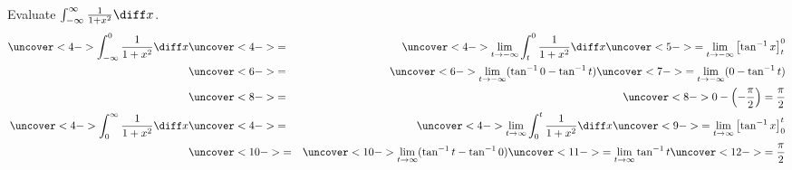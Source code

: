 \begin{frame}
\begin{example} %
Evaluate $\int_{-\infty}^\infty \frac{1}{1+x^2}\diff x$.
\abovedisplayskip=0pt
\belowdisplayskip=0pt
%
\begin{eqnarray*}
\uncover<4->{%
\int_{-\infty}^0 \frac{1}{1+x^2}\diff x%
}%
& \uncover<4->{ = } &%
\uncover<4->{%
\lim_{t\rightarrow -\infty} \int_{t}^0 \frac{1}{1+x^2}\diff x%
}%
\uncover<5->{%
 = \lim_{t\rightarrow -\infty} \left[ \tan^{-1} x\right]_t^0%
}\\%
& \uncover<6->{ = } &%
\uncover<6->{%
\lim_{t\rightarrow -\infty} (\tan^{-1} 0 - \tan^{-1} t)%
}%
\uncover<7->{%
 = \lim_{t\rightarrow -\infty}  (0 -\tan^{-1} t) %
}\\%
& \uncover<8->{ = } &%
\uncover<8->{%
0 - \left( -\frac{\pi}{2}\right) = \frac{\pi}{2}%
}\\%
\uncover<4->{%
\int_0^{\infty} \frac{1}{1+x^2}\diff x%
}%
& \uncover<4->{ = } &%
\uncover<4->{%
\lim_{t\rightarrow \infty} \int_{0}^t \frac{1}{1+x^2}\diff x%
}%
\uncover<9->{%
 = \lim_{t\rightarrow \infty} \left[ \tan^{-1} x\right]_0^t%
}\\%
& \uncover<10->{ = } &%
\uncover<10->{%
\lim_{t\rightarrow \infty} (\tan^{-1} t - \tan^{-1} 0)%
}%
\uncover<11->{%
 = \lim_{t\rightarrow \infty} \tan^{-1} t %
}%
\uncover<12->{%
 = \frac{\pi}{2}
}%
\end{eqnarray*}
\end{example}
\end{frame}

